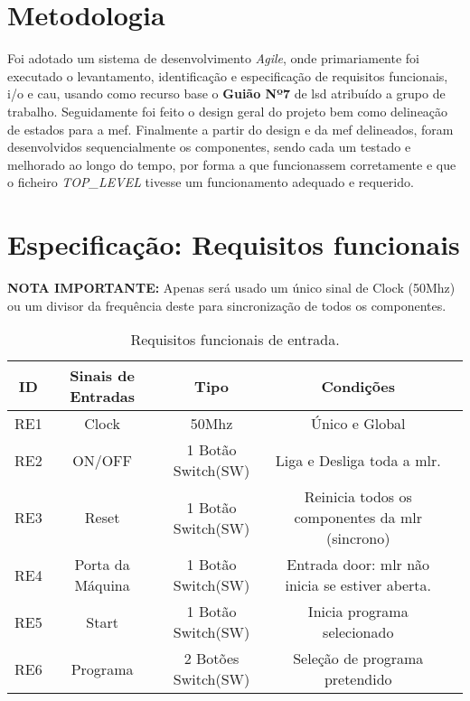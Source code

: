 \section{Metodologia}
\label{sec.requisitos}
Foi adotado um sistema de desenvolvimento \textit{Agile}, onde primariamente foi executado o levantamento, identificação e especificação de requisitos funcionais, \ac{i/o} e \ac{cau}, usando como recurso base o \textbf{Guião Nº7} de \ac{lsd} atribuído a grupo de trabalho. Seguidamente foi feito o design geral do projeto bem como delineação de estados para a \ac{mef}. Finalmente a partir do design e da \ac{mef} delineados, foram desenvolvidos sequencialmente os componentes, sendo cada um testado e melhorado ao longo do tempo, por forma a que funcionassem corretamente e que o ficheiro \textit{TOP\_LEVEL} tivesse um funcionamento adequado e requerido.


\section{Especificação: Requisitos funcionais}
\label{sec.requisitos}

\textbf{NOTA IMPORTANTE:} Apenas será usado um único sinal de Clock (50Mhz) ou um divisor da frequência deste para sincronização de todos os componentes. 
	
\begin{table}[H]
	\centering
	\caption{Requisitos funcionais de entrada.}
	\begin{tabular}{|c|c|c|c|c|}\hline
	
		ID & Sinais de Entradas & Tipo & Condições \\ 
        \hline
        RE1 & Clock & 50Mhz & Único e Global \\
		RE2 & ON/OFF & 1 Botão Switch(SW) & Liga e Desliga toda a \ac{mlr}. \\	    
	    RE3 & Reset & 1 Botão Switch(SW) & Reinicia todos os componentes da \ac{mlr} (sincrono) \\ 
		RE4 & Porta da Máquina & 1 Botão Switch(SW) & Entrada door: \ac{mlr} não inicia se estiver aberta. \\
		RE5 & Start & 1 Botão Switch(SW) & Inicia programa selecionado    \\
	    RE6 & Programa & 2 Botões Switch(SW) & Seleção de programa pretendido   \\
    \hline
    \end{tabular}
    \label{tab.req_funcionais_entrada}
\end{table}	

